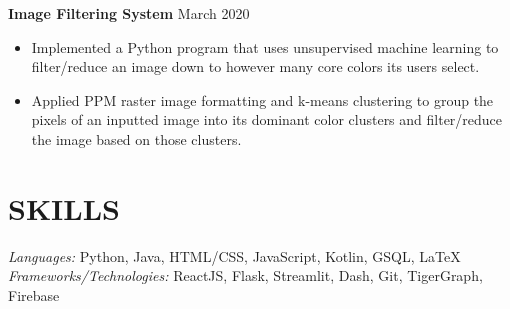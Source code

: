 \documentclass[11pt]{res}
\begin{document}
\begin{footnotesize}
\begin{resume}
\begin{itemize}
\end{itemize}
\vspace{-2.5mm}
\textbf{Image Filtering System} \hfill March 2020\vspace{-5.25mm}
\begin{itemize} \itemsep -2pt
\item Implemented a Python program that uses unsupervised machine learning to filter/reduce an image down to however many core colors its users select.
\vspace{.75mm}
\item Applied PPM raster image formatting and k-means clustering to group the pixels of an inputted image into its dominant color clusters and filter/reduce the image based on those clusters. 
\end{itemize}
\section{SKILLS} 
{\sl Languages:} 
Python, Java, HTML/CSS, JavaScript, Kotlin, GSQL, \LaTeX \\
{\sl Frameworks/Technologies:} ReactJS, Flask, Streamlit, Dash, Git, TigerGraph, Firebase

\end{resume}
\end{footnotesize}
\end{document}
